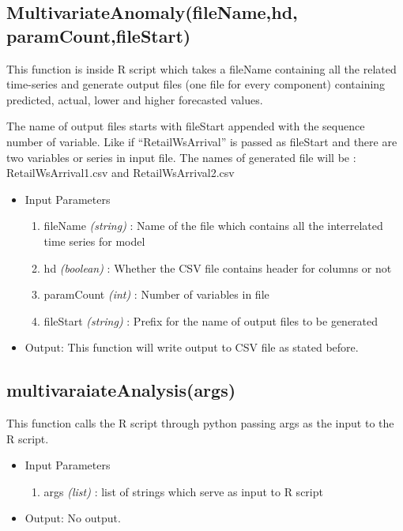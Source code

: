 \subsection{MultivariateAnomaly(fileName,hd, paramCount,fileStart)}

This function is inside R script which takes a fileName containing all the related 
time-series and generate output files (one file for every component) containing predicted, actual,
lower and higher forecasted values. 

The name of output files starts with fileStart appended with
the sequence number of variable. Like if ``RetailWsArrival'' is passed as fileStart and there are 
two variables or series in input file. The names of generated file will be : RetailWsArrival1.csv and 
RetailWsArrival2.csv

\begin{itemize}
 \item Input Parameters
 
 \begin{enumerate}
  \item fileName \textit{(string)} : Name of the file which contains all the interrelated time series for model
  \item hd \textit{(boolean)} : Whether the CSV file contains header for columns or not 
  \item paramCount \textit{(int)} : Number of variables in file 
  \item fileStart \textit{(string)} : Prefix for the name of output files to be generated
  
 \end{enumerate}

 \item Output: This function will write output to CSV file as stated before.

\end{itemize}

\subsection{multivaraiateAnalysis(args)}

This function calls the R script through python passing args as the input to the R script.

\begin{itemize}
 \item Input Parameters
 
 \begin{enumerate}
  \item args \textit{(list)} : list of strings which serve as input to R script 

 \end{enumerate}

 \item Output: No output.

\end{itemize}

